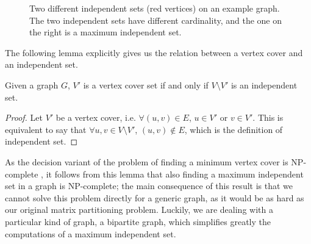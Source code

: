 \begin{figure}[h]
	\centering
{}
	\caption{Two different independent sets (red vertices) on an example graph. The two independent sets have different cardinality, and the one on the right is a maximum independent set.} \label{fig:is_example}
\end{figure}

The following lemma explicitly gives us the relation between a vertex cover and an independent set.

\begin{lemma} 
	\label{lemma:is}
	Given a graph $G$, $V'$ is a vertex cover set if and only if $V \setminus V'$ is an independent set.
\end{lemma}
\begin{proof}
	Let $V'$ be a vertex cover, i.e. $\forall (u,v) \in E$, $u \in V'$ or $v \in V'$. This is equivalent to say that $\forall u,v \in V \setminus V'$, $(u,v) \notin E$, which is the definition of independent set.
\end{proof}

As the decision variant of the problem of finding a minimum vertex cover is NP-complete \cite[Theorem 3.3]{np_book}, it follows from this lemma that also finding a maximum independent set in a graph is NP-complete; the main consequence of this result is that we cannot solve this problem directly for a generic graph, as it would be as hard as our original matrix partitioning problem. Luckily, we are dealing with a particular kind of graph, a bipartite graph, which simplifies greatly the computations of a maximum independent set.

